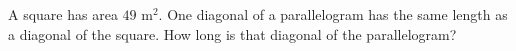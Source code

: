 A square has area $49\text{ m}^2$. One diagonal of a parallelogram has the same length as a diagonal of the square. How long is that diagonal of the parallelogram?
